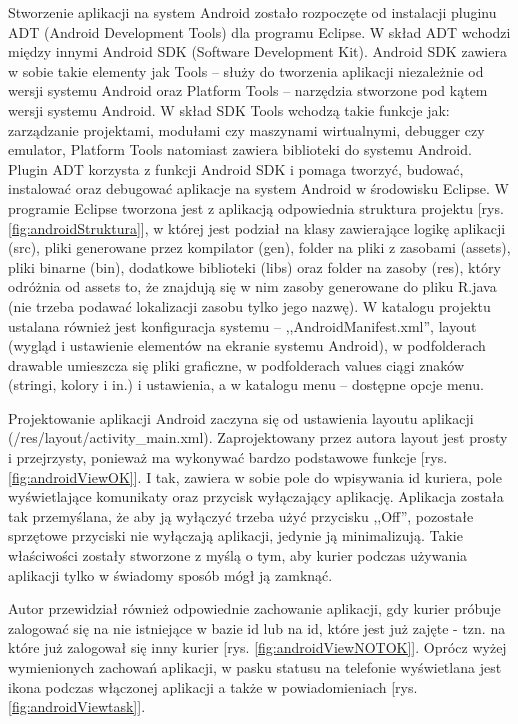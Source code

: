 \documentclass[eng,printmode,oneside]{mgr}
\begin{document}
Stworzenie aplikacji na system Android zostało rozpoczęte od instalacji
pluginu ADT (Android Development Tools) dla programu Eclipse. W skład ADT
wchodzi między innymi Android SDK (Software Development Kit).
Android SDK zawiera w sobie takie elementy jak Tools -- służy do tworzenia aplikacji niezależnie od
wersji systemu Android oraz Platform Tools -- narzędzia stworzone pod kątem
wersji systemu Android. W skład SDK Tools wchodzą takie funkcje jak: zarządzanie
projektami, modułami czy maszynami wirtualnymi, debugger czy emulator,
Platform Tools natomiast zawiera biblioteki do systemu Android. Plugin ADT 
korzysta z funkcji Android SDK i pomaga tworzyć, budować, instalować oraz debugować
aplikacje na system Android w środowisku Eclipse. W programie Eclipse tworzona
jest z aplikacją odpowiednia struktura projektu [rys. \ref{fig:androidStruktura}], w
której jest podział na klasy zawierające logikę aplikacji (src), pliki
generowane przez kompilator (gen), folder na pliki z zasobami (assets), pliki
binarne (bin), dodatkowe biblioteki (libs) oraz folder na zasoby (res), który
odróżnia od assets to, że znajdują się w nim zasoby generowane do pliku R.java
(nie trzeba podawać lokalizacji zasobu tylko jego nazwę). W katalogu projektu
ustalana również jest konfiguracja systemu -- ,,AndroidManifest.xml'', layout
(wygląd i ustawienie elementów na ekranie systemu Android), w podfolderach
drawable umieszcza się pliki graficzne, w podfolderach values ciągi znaków
(stringi, kolory i in.) i ustawienia, a w katalogu menu -- dostępne opcje menu.

Projektowanie aplikacji Android zaczyna się od ustawienia layoutu aplikacji
(/res/layout/activity\_main.xml). Zaprojektowany przez autora layout jest
prosty i przejrzysty, ponieważ ma wykonywać bardzo podstawowe funkcje [rys.
\ref{fig:androidViewOK}]. I tak, zawiera w sobie pole do wpisywania id kuriera,
pole wyświetlające komunikaty oraz przycisk wyłączający aplikację. Aplikacja została
tak przemyślana, że aby ją wyłączyć trzeba użyć przycisku ,,Off'', pozostałe
sprzętowe przyciski nie wyłączają aplikacji, jedynie ją minimalizują. Takie
właściwości zostały stworzone z myślą o tym, aby kurier podczas używania aplikacji tylko w świadomy
sposób mógł ją zamknąć.

Autor przewidział również odpowiednie zachowanie aplikacji, gdy kurier próbuje
zalogować się na nie istniejące w bazie id lub na id, które jest już zajęte -
tzn. na które już zalogował się inny kurier [rys. \ref{fig:androidViewNOTOK}]. 
Oprócz wyżej wymienionych zachowań aplikacji, w pasku statusu na telefonie
wyświetlana jest ikona podczas włączonej aplikacji a także w
powiadomieniach [rys. \ref{fig:androidViewtask}].
\end{document}
